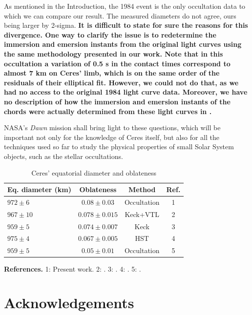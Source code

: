 \documentclass[useAMS,usenatbib]{mn2e}
\begin{document}
As mentioned in the Introduction, the 1984 event \citep{Millis1987} is the only occultation data to which we can compare our result. The measured diameters do not agree, ours being larger by 2-sigma. \textbf{It is difficult to state for sure the reasons for this divergence. One way to clarify the issue is to redetermine the immersion and emersion instants from the original light curves using the same methodology presented in our work. Note that in this occultation a variation of 0.5 s in the contact times correspond to almost 7 km on Ceres' limb, which is on the same order of the residuals of their elliptical fit. However, we could not do that, as we had no access to the original 1984 light curve data. Moreover, we have no description of how the immersion and emersion instants of the chords were actually determined from these light curves in \cite{Millis1987}.}

NASA's \textit{Dawn} mission shall bring light to these questions, which will be important not only for the knowledge of Ceres itself, but also for all the techniques used so far to study the physical properties of small Solar System objects, such as the stellar occultations.


\begin{table}
  \caption{Ceres' equatorial diameter and oblateness \label{Tab: Ceres-final}}
  \begin{centering}
  \begin{tabular}{@{}lccc}
  \hline
     Eq. diameter (km) & Oblateness & Method & Ref. \\
\hline
$972 \pm 6$  & $0.08  \pm 0.03$  & Occultation & 1\\
$967 \pm 10$ & $0.078 \pm 0.015$ & Keck+VTL    & 2\\
$959 \pm 5$  & $0.074 \pm 0.007$ & Keck        & 3\\
$975 \pm 4$  & $0.067 \pm 0.005$ & HST         & 4\\
$959 \pm 5$  & $0.05  \pm 0.01$  & Occultation & 5\\
\hline
\end{tabular}
\par\end{centering}
\textbf{References.} 1: Present work. 2: \cite{Drummond2014}. 3: \cite{Carry2008}. 4: \cite{Thomas2005}. 5: \cite{Millis1987}.
\end{table}


\section*{Acknowledgements}
\end{document}
